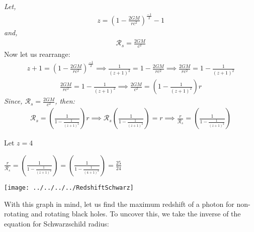 \documentclass{article}
\begin{document}
\textit{Let,}
\begin{gather*}
	z = {\left(1-\frac{2GM}{rc^2}\right)^{\frac{-1}{2}} - 1}
\end{gather*}
\textit{and,}
\begin{gather*}
	\mathcal{R}_s = \frac{2GM}{c^2}
\end{gather*}
Now let us rearrange:
\begin{gather*}
	z+1 =  {\left(1-\frac{2GM}{rc^2}\right)^{\frac{-1}{2}} \implies \frac{1}{(z+1)^2} = 1 - \frac{2GM}{rc^2} \implies \frac{2GM}{rc^2} = 1 - \frac{1}{(z+1)^2} }
\end{gather*}
\begin{gather*}
	\frac{2GM}{rc^2} = 1 - \frac{1}{(z+1)^2} \implies \frac{2GM}{c^2} = \left(1-\frac{1}{(z+1)^2}\right)r
\end{gather*}
\textit{Since, $\mathcal{R}_s = \frac{2GM}{c^2}$, then:}
\begin{gather*}
	\mathcal{R}_s =  \left(\frac{1}{1-\frac{1}{(z+1)^2}}\right)r \implies \mathcal{R}_s\left(\frac{1}{1-\frac{1}{(z+1)^2}}\right) = r \implies \frac{r}{\mathcal{R}_s} = \left(\frac{1}{1-\frac{1}{(z+1)^2}}\right) 
\end{gather*}

Let $z = 4$
\begin{center}
	$\boxed{\frac{r}{\mathcal{R}_s} = \left(\frac{1}{1-\frac{1}{(z+1)^2}}\right) = \left(\frac{1}{1-\frac{1}{(4+1)^2}}\right) = \frac{25}{24}}
	$
\end{center}


\begin{center}
	
	\texttt{[image: ../../../../RedshiftSchwarz]}

	\label{fig:redshiftschwarz}
\end{center}

With this graph in mind, let us find the maximum redshift of a photon for non-rotating and rotating black holes. To uncover this, we take the inverse of the equation for Schwarzschild radius: 
\end{document}
